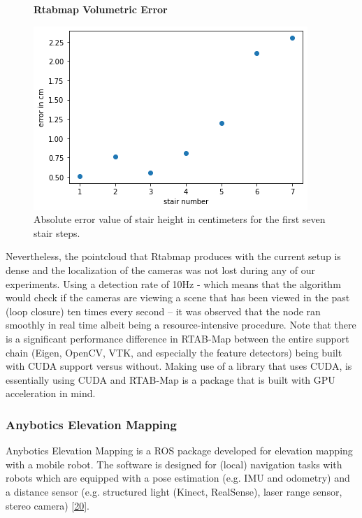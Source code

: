 \documentclass{article}
\begin{document}
\begin{figure}[h] %
    \centering
    \textbf{Rtabmap Volumetric Error}\par\medskip
	\includegraphics[width=\textwidth,height=\textheight,keepaspectratio]{report1-img014.png} %
	\caption{Absolute error value of stair height in centimeters for the first seven stair steps. }
\end{figure}

\clearpage

Nevertheless, the pointcloud that Rtabmap produces with the current setup is dense and the localization of the cameras was not lost during any of our experiments. Using a detection rate of 10Hz - which means that the algorithm would check if the cameras are viewing a scene that has been viewed in the past (loop closure) ten times every second – it was observed that the node ran smoothly in real time albeit being a resource-intensive procedure. Note that there is a significant performance difference in RTAB-Map between the entire support chain (Eigen, OpenCV, VTK, and especially the feature detectors) being built with CUDA support versus without. Making use of a library that uses CUDA, is essentially using CUDA and  RTAB-Map is a package that is built with GPU acceleration in mind.

\subsubsection{Anybotics Elevation Mapping}

Anybotics Elevation Mapping is a ROS package developed for elevation mapping with a mobile robot. The software is designed for (local) navigation tasks with robots which are equipped with a pose estimation (e.g. IMU and odometry) and a distance sensor (e.g. structured light (Kinect, RealSense), laser range sensor, stereo camera) \href{https://github.com/ANYbotics/elevation_mapping}{[20]}. 
\end{document}
